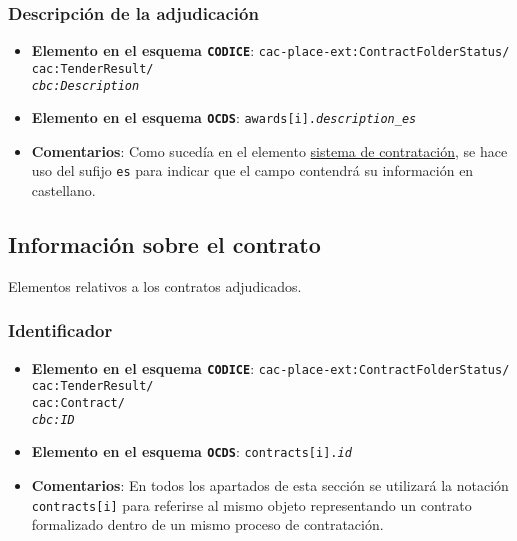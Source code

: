         \subsubsection{Descripción de la adjudicación}
            \begin{itemize}
                \item \textbf{Elemento en el esquema \texttt{CODICE}}:
                    \tabto{7.6cm} \texttt{cac-place-ext:ContractFolderStatus/} \\
                    \tabto{7.6cm} \texttt{cac:TenderResult/} \\
                    \tabto{7.6cm} \texttt{\textit{cbc:Description}}
                \item \textbf{Elemento en el esquema \texttt{OCDS}}:
                    \tabto{7.6cm} \texttt{awards[i].\textit{description\_es}}
                \item \textbf{Comentarios}: Como sucedía en el elemento  \hyperref[subsubsec:SistemaDeContratacion]{sistema de contratación}, se hace uso del sufijo \texttt{es} para indicar que el campo contendrá su información en castellano.
            \end{itemize}
            
    \vspace{0.3cm}
    
    \subsection{Información sobre el contrato}
        
        Elementos relativos a los contratos adjudicados.
    
        \subsubsection{Identificador}
            \begin{itemize}
                \item \textbf{Elemento en el esquema \texttt{CODICE}}:
                    \tabto{7.6cm} \texttt{cac-place-ext:ContractFolderStatus/} \\
                    \tabto{7.6cm} \texttt{cac:TenderResult/} \\
                    \tabto{7.6cm} \texttt{cac:Contract/} \\
                    \tabto{7.6cm} \texttt{\textit{cbc:ID}}
                \item \textbf{Elemento en el esquema \texttt{OCDS}}:
                    \tabto{7.6cm} \texttt{contracts[i].\textit{id}}
                \item \textbf{Comentarios}: En todos los apartados de esta sección se utilizará la notación \texttt{contracts[i]} para referirse al mismo objeto representando un contrato formalizado dentro de un mismo proceso de contratación.
            \end{itemize}
            
